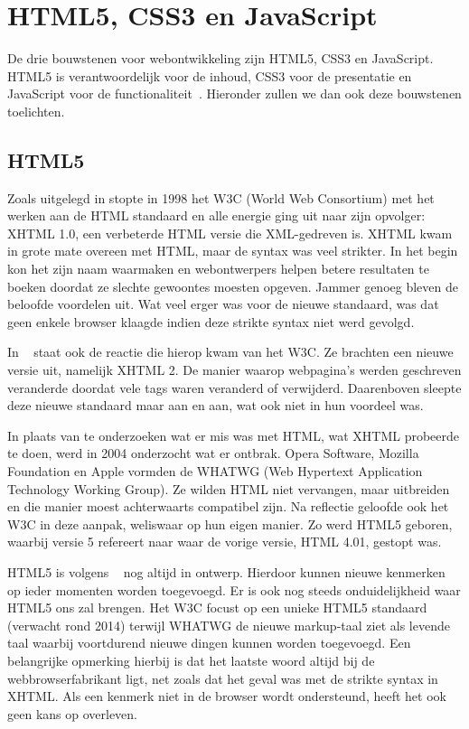 
\section{HTML5, CSS3 en JavaScript}
\label{sec:html5-css3-js}
De drie bouwstenen voor webontwikkeling zijn HTML5, CSS3 en JavaScript. HTML5 is verantwoordelijk voor de inhoud, CSS3 voor de presentatie en JavaScript voor de functionaliteit~\cite{PhilDutson2012}. Hieronder zullen we dan ook deze bouwstenen toelichten.

\subsection{HTML5}
Zoals uitgelegd in \cite{MacDonald2011} stopte in 1998 het W3C (World Web Consortium) met het werken aan de HTML standaard en alle energie ging uit naar zijn opvolger: XHTML 1.0, een verbeterde HTML versie die XML-gedreven is. XHTML kwam in grote mate overeen met HTML, maar de syntax was veel strikter. In het begin kon het zijn naam waarmaken en webontwerpers helpen betere resultaten te boeken doordat ze slechte gewoontes moesten opgeven. Jammer genoeg bleven de beloofde voordelen uit. Wat veel erger was voor de nieuwe standaard, was dat geen enkele browser klaagde indien deze strikte syntax niet werd gevolgd.

In ~\cite{MacDonald2011} staat ook de reactie die hierop kwam van het W3C.  Ze brachten een nieuwe versie uit, namelijk XHTML 2. De manier waarop webpagina's werden geschreven veranderde doordat vele tags waren veranderd of verwijderd. Daarenboven sleepte deze nieuwe standaard maar aan en aan, wat ook niet in hun voordeel was. 

In plaats van te onderzoeken wat er mis was met HTML, wat XHTML probeerde te doen, werd in 2004 onderzocht wat er ontbrak. Opera Software, Mozilla Foundation en Apple vormden de WHATWG (Web Hypertext Application Technology Working Group). Ze wilden HTML niet vervangen, maar uitbreiden en die manier moest achterwaarts compatibel zijn. Na reflectie geloofde ook het W3C in deze aanpak, weliswaar op hun eigen manier.  Zo werd HTML5 geboren, waarbij versie 5 refereert naar waar de vorige versie, HTML 4.01, gestopt was.

HTML5 is volgens ~\cite{MacDonald2011} nog altijd in ontwerp. Hierdoor kunnen nieuwe kenmerken op ieder momenten worden toegevoegd.  Er is ook nog steeds onduidelijkheid waar HTML5 ons zal brengen.  Het W3C focust op een unieke HTML5 standaard (verwacht rond 2014) terwijl WHATWG de nieuwe markup-taal ziet als levende taal waarbij voortdurend  nieuwe dingen kunnen worden toegevoegd. Een belangrijke opmerking hierbij is dat het laatste woord altijd bij de webbrowserfabrikant ligt, net zoals dat het geval was met de strikte syntax in XHTML. Als een kenmerk niet in de browser wordt ondersteund, heeft het ook geen kans op overleven.

